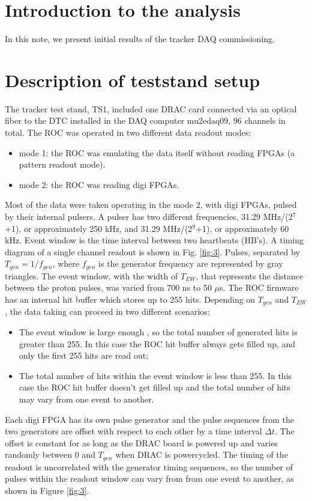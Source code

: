 \section {Introduction to the analysis}

In this note, we present initial results of the tracker DAQ commissioning.
\section{Description of teststand setup}
The tracker test stand,  TS1, included one DRAC card connected via an optical fiber
to the DTC installed in the DAQ computer mu2edaq09, 96 channels in total.
The ROC was operated in two different data readout modes:
\begin{itemize}
\item 
  mode 1: the ROC was emulating the data itself without reading FPGAs (a pattern readout mode).
\item 
  mode 2: the ROC was reading digi FPGAs.
\end{itemize}

Most of the data were taken operating in the mode 2, with digi FPGAs, pulsed by their internal pulsers.
A pulser has two different frequencies,  31.29 MHz/(2$^7$+1), or approximately 250 kHz, 
and 31.29 MHz/(2$^9$+1), or approximately 60 kHz.
Event window is the time interval between two heartbeats (HB's). 
A timing diagram of a single channel readout is shown in Fig. \ref{fig:3}.
Pulses, separated by $T_{gen}=1/f_{gen}$, where $f_{gen}$ is the generator frequency
are represented by gray triangles.
The event window, with the width of $T_{EW}$, that represents the distance between the proton pulses, 
was varied from 700 ns to 50 $\mu$s. 
The ROC firmware has an internal hit buffer which stores up to 255 hits.
Depending on $T_{gen}$ and $T_{EW}$, the data taking can proceed in two different
scenarios:
\begin{itemize}
\item
  The event window is large enough , so the total number of generated hits is greater than 255. In this case
  the ROC hit buffer always gets filled up, and only the first 255 hits are read out;
\item
  The total number of hits within the event window is less than 255.
  In this case the ROC hit buffer doesn't get filled up and the total number of hits may vary from one event to another.
\end{itemize}

Each digi FPGA has its own pulse generator and the pulse sequences from the two
generators are offset with respect to each other by a time interval $\Delta t$.
The offset is constant for as long as the DRAC board is powered up and varies randomly between 0 and $T_{gen}$ when DRAC is powercycled.
The timing of the readout is uncorrelated with the generator timing sequences,
  so the number of pulses within the readout window can vary from  from one event to another, as shown
  in Figure \ref{fig:3}.

